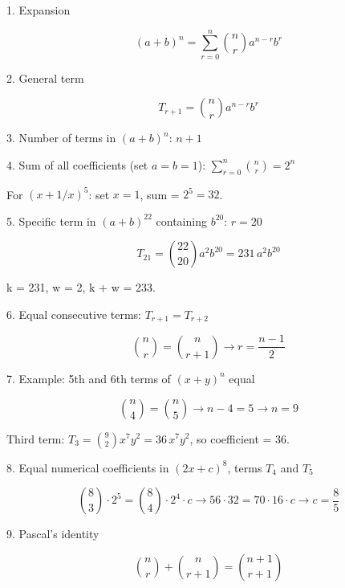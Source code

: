 1. Expansion

$$ (a+b)^n = \sum_{r=0}^{n} \binom{n}{r} a^{n-r} b^r $$

2. General term

$$ T_{r+1} = \binom{n}{r} a^{n-r} b^r $$

3. Number of terms in $(a+b)^n$: $n + 1$

4. Sum of all coefficients (set $a = b = 1$): $\sum_{r=0}^{n} \binom{n}{r} = 2^n$

For $(x + 1/x)^5$: set $x = 1$, sum = $2^5 = 32$.

5. Specific term in $(a+b)^{22}$ containing $b^{20}$: $r=20$

$$ T_{21} = \binom{22}{20} a^2 b^{20} = 231\, a^2 b^{20} $$

k = 231, w = 2, k + w = 233.

6. Equal consecutive terms: $T_{r+1} = T_{r+2}$

$$ \binom{n}{r} = \binom{n}{r+1} \rightarrow r = \frac{n-1}{2} $$

7. Example: 5th and 6th terms of $(x+y)^n$ equal

$$ \binom{n}{4} = \binom{n}{5} \rightarrow n-4=5 \rightarrow n=9 $$

Third term: $T_3 = \binom{9}{2} x^7 y^2 = 36\, x^7 y^2$, so coefficient = 36.

8. Equal numerical coefficients in $(2x+c)^8$, terms $T_4$ and $T_5$

$$ \binom{8}{3} \cdot 2^5 = \binom{8}{4} \cdot 2^4 \cdot c \rightarrow 56 \cdot 32 = 70 \cdot 16 \cdot c \rightarrow c = \frac{8}{5} $$

9. Pascal's identity

$$ \binom{n}{r} + \binom{n}{r+1} = \binom{n+1}{r+1} $$
